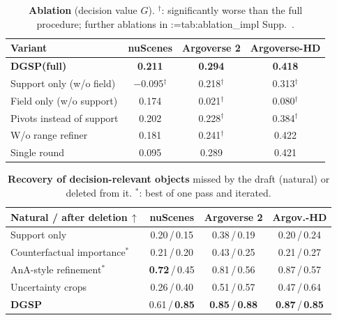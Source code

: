 \documentclass[10pt,twocolumn,letterpaper]{article}
\makeatletter
\newcommand{\method}{DGSP\xspace}
\newcommand{\G}{G}                %
\theoremstyle{definition}
\theoremstyle{remark}
\newcommand{\best}[1]{\textbf{#1}}
\newcommand{\oursrow}{\rowcolor{oursbg}}
\DeclareRobustCommand{\supp}[1]{\def\supp@list{}\@for\supp@i:=#1\do{\ifx\supp@list\@empty\edef\supp@list{S-\supp@i}\else\edef\supp@list{\supp@list,S-\supp@i}\fi}%
\edef\supp@cmd{\noexpand\Cref*{\supp@list}}Supp.~\supp@cmd}
\makeatother
\begin{document}
\begin{table}[t]
\centering
\caption{\textbf{Ablation} (decision value $\G$). $^{\dagger}$: significantly worse than the full procedure; further ablations in \supp{tab:ablation_impl}.}
\label{tab:ablation}
\footnotesize
\setlength{\tabcolsep}{3.6pt}
\begin{tabular}{@{}lccc@{}}
\toprule
Variant & nuScenes & Argoverse 2 & Argoverse-HD \\
\midrule
\oursrow \textbf{\method (full)} & \textbf{0.211} & \textbf{0.294} & \textbf{0.418} \\
\midrule
Support only (w/o field) & $-$0.095$^{\dagger}$ & 0.218$^{\dagger}$ & 0.313$^{\dagger}$ \\
Field only (w/o support) & 0.174 & 0.021$^{\dagger}$ & 0.080$^{\dagger}$ \\
Pivots instead of support & 0.202 & 0.228$^{\dagger}$ & 0.384$^{\dagger}$ \\
W/o range refiner & 0.181 & 0.241$^{\dagger}$ & 0.422 \\
Single round & 0.095 & 0.289 & 0.421 \\
\bottomrule
\end{tabular}
\end{table}

\begin{table}[t]
\centering
\caption{\textbf{Recovery of decision-relevant objects} missed by the draft (natural) or deleted from it. $^{\ast}$: best of one pass and iterated.}
\label{tab:field}
\footnotesize
\setlength{\tabcolsep}{3.4pt}
\begin{tabular}{@{}lccc@{}}
\toprule
Natural / after deletion\,$\uparrow$ & nuScenes & Argoverse 2 & Argov.-HD \\
\midrule
Support only & 0.20\,/\,0.15 & 0.38\,/\,0.19 & 0.20\,/\,0.24 \\
Counterfactual importance$^{\ast}$ & 0.21\,/\,0.20 & 0.43\,/\,0.25 & 0.21\,/\,0.27 \\
AnA-style refinement$^{\ast}$ & \best{0.72}\,/\,0.45 & 0.81\,/\,0.56 & 0.87\,/\,0.57 \\
Uncertainty crops & 0.26\,/\,0.40 & 0.51\,/\,0.57 & 0.47\,/\,0.64 \\
\oursrow \textbf{\method} & 0.61\,/\,\best{0.85} & \best{0.85}\,/\,\best{0.88} & \best{0.87}\,/\,\best{0.85} \\
\bottomrule
\end{tabular}
\end{table}
\end{document}
